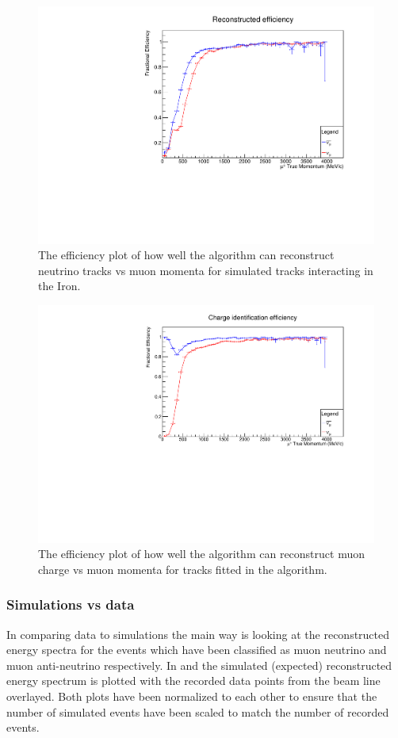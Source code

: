 \begin{figure}[h!]
\centering
\includegraphics[width=.9\textwidth]{figures/NeutrinoChap/Neutrino/T2KIronRecEff.pdf}
\caption{The efficiency plot of how well the algorithm can reconstruct neutrino tracks vs muon momenta for simulated tracks interacting in the Iron.}
\label{fig:IronMINDfitted}
\end{figure}

\begin{figure}[h!]
\centering
\includegraphics[width=.9\textwidth]{figures/NeutrinoChap/Neutrino/T2KIronChargeEff.pdf}
\caption{The efficiency plot of how well the algorithm can reconstruct muon charge vs muon momenta for tracks fitted in the algorithm.}
\label{fig:IronMINDfittedcharge}
\end{figure}

\pagebreak
\subsubsection{Simulations vs data}
In comparing data to simulations the main way is looking at the reconstructed energy spectra for the events which have been classified as muon neutrino and muon anti-neutrino respectively. In  and  the simulated (expected) reconstructed energy spectrum is plotted with the recorded data points from the beam line overlayed. Both plots have been normalized to each other to ensure that the number of simulated events have been scaled to match the number of recorded events.


